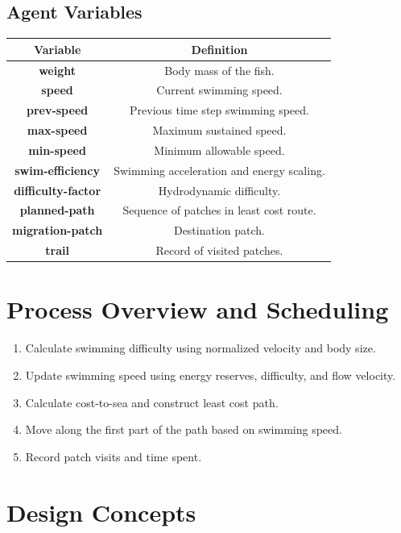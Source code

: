 \documentclass[
]{book}
\providecommand{\tightlist}{%
  \setlength{\itemsep}{0pt}\setlength{\parskip}{0pt}}
\begin{document}
\subsection{Agent Variables}\label{agent-variables-8}

\begin{longtable}[]{@{}cc@{}}
\toprule\noalign{}
Variable & Definition \\
\midrule\noalign{}
\endhead
\bottomrule\noalign{}
\endlastfoot
\textbf{weight} & Body mass of the fish. \\
\textbf{speed} & Current swimming speed. \\
\textbf{prev-speed} & Previous time step swimming speed. \\
\textbf{max-speed} & Maximum sustained speed. \\
\textbf{min-speed} & Minimum allowable speed. \\
\textbf{swim-efficiency} & Swimming acceleration and energy scaling. \\
\textbf{difficulty-factor} & Hydrodynamic difficulty. \\
\textbf{planned-path} & Sequence of patches in least cost route. \\
\textbf{migration-patch} & Destination patch. \\
\textbf{trail} & Record of visited patches. \\
\end{longtable}

\section{Process Overview and Scheduling}\label{process-overview-and-scheduling-8}

\begin{enumerate}
\def\labelenumi{\arabic{enumi}.}
\tightlist
\item
  Calculate swimming difficulty using normalized velocity and body
  size.
\item
  Update swimming speed using energy reserves, difficulty, and flow
  velocity.
\item
  Calculate cost-to-sea and construct least cost path.
\item
  Move along the first part of the path based on swimming speed.
\item
  Record patch visits and time spent.
\end{enumerate}

\section{Design Concepts}\label{design-concepts-8}
\end{document}
